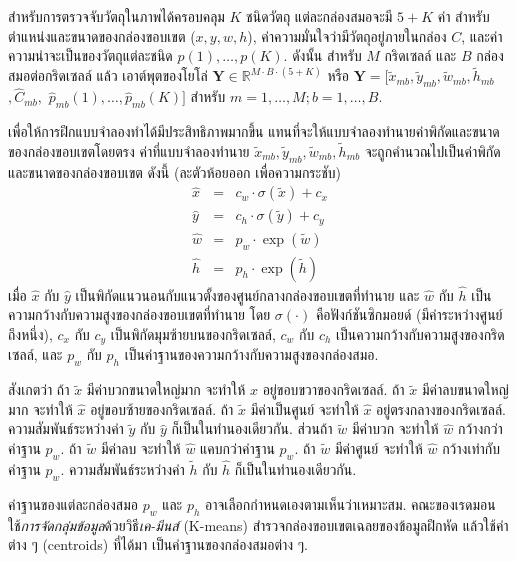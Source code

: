 สำหรับการตรวจจับวัตถุในภาพได้ครอบคลุม $K$ ชนิดวัตถุ 
แต่ละกล่องสมอจะมี $5 + K$ ค่า สำหรับตำแหน่งและขนาดของกล่องขอบเขต ($x, y, w, h$), ค่าความมั่นใจว่ามีวัตถุอยู่ภายในกล่อง $C$,
และค่าความน่าจะเป็นของวัตถุแต่ละชนิด $p(1), \ldots, p(K)$.
ดังนั้น สำหรับ $M$ กริดเซลล์ และ $B$ กล่องสมอต่อกริดเซลล์ แล้ว เอาต์พุตของโยโล่ $\bm{Y} \in \mathbb{R}^{M \cdot B \cdot (5 + K)}$ หรือ $\bm{Y} = [\tilde{x}_{mb}, \tilde{y}_{mb}, \tilde{w}_{mb}, \tilde{h}_{mb}$ $, \hat{C}_{mb},$ $\hat{p}_{mb}(1), \ldots, \hat{p}_{mb}(K)]$ สำหรับ $m = 1, \ldots, M; b = 1, \ldots, B$. 

เพื่อให้การฝึกแบบจำลองทำได้มีประสิทธิภาพมากขึ้น
แทนที่จะให้แบบจำลองทำนายค่าพิกัดและขนาดของกล่องขอบเขตโดยตรง
ค่าที่แบบจำลองทำนาย $\tilde{x}_{mb}, \tilde{y}_{mb}, \tilde{w}_{mb}, \tilde{h}_{mb}$
จะถูกคำนวณไปเป็นค่าพิกัดและขนาดของกล่องขอบเขต ดังนี้ (ละตัวห้อยออก เพื่อความกระชับ)
\begin{eqnarray}
\hat{x} &=&  c_w \cdot \sigma(\tilde{x}) + c_x
\label{eq: YOLO x} \\
\hat{y} &=&  c_h \cdot \sigma(\tilde{y}) + c_y
\label{eq: YOLO y} \\
\hat{w} &=&  p_w \cdot \exp(\tilde{w})
\label{eq: YOLO w} \\
\hat{h} &=&  p_h \cdot \exp(\tilde{h})
\label{eq: YOLO h}
\end{eqnarray}
เมื่อ $\hat{x}$ กับ $\hat{y}$ เป็นพิกัดแนวนอนกับแนวตั้งของศูนย์กลางกล่องขอบเขตที่ทำนาย
และ $\hat{w}$ กับ $\hat{h}$ เป็นความกว้างกับความสูงของกล่องขอบเขตที่ทำนาย
โดย $\sigma(\cdot)$ คือฟังก์ชันซิกมอยด์ (มีค่าระหว่างศูนย์ถึงหนึ่ง),
$c_x$ กับ $c_y$ เป็นพิกัดมุมซ้ายบนของกริดเซลล์,
$c_w$ กับ $c_h$ เป็นความกว้างกับความสูงของกริดเซลล์,
และ $p_w$ กับ $p_h$ เป็นค่าฐานของความกว้างกับความสูงของกล่องสมอ.

สังเกตว่า ถ้า $\tilde{x}$ มีค่าบวกขนาดใหญ่มาก จะทำให้ $\hat{x}$ อยู่ขอบขวาของกริดเซลล์.
ถ้า $\tilde{x}$ มีค่าลบขนาดใหญ่มาก จะทำให้ $\hat{x}$ อยู่ขอบซ้ายของกริดเซลล์.
ถ้า $\tilde{x}$ มีค่าเป็นศูนย์ จะทำให้ $\hat{x}$ อยู่ตรงกลางของกริดเซลล์.
ความสัมพันธ์ระหว่างค่า $\tilde{y}$ กับ $\hat{y}$ ก็เป็นในทำนองเดียวกัน.
ส่วนถ้า $\tilde{w}$ มีค่าบวก จะทำให้ $\hat{w}$ กว้างกว่าค่าฐาน $p_w$.
ถ้า $\tilde{w}$ มีค่าลบ จะทำให้ $\hat{w}$ แคบกว่าค่าฐาน $p_w$.
ถ้า $\tilde{w}$ มีค่าศูนย์ จะทำให้ $\hat{w}$ กว้างเท่ากับค่าฐาน $p_w$.
ความสัมพันธ์ระหว่างค่า $\tilde{h}$ กับ $\hat{h}$ ก็เป็นในทำนองเดียวกัน.

ค่าฐานของแต่ละกล่องสมอ $p_w$ และ $p_h$ อาจเลือกกำหนดเองตามเห็นว่าเหมาะสม.
คณะของเรดมอน\cite{YOLO2} ใช้\textit{การจัดกลุ่มข้อมูล}ด้วยวิธี\textit{เค-มีนส์} (K-means)
สำรวจกล่องขอบเขตเฉลยของข้อมูลฝึกหัด
แล้วใช้ค่า
ต่าง ๆ (centroids) ที่ได้มา เป็นค่าฐานของกล่องสมอต่าง ๆ.


